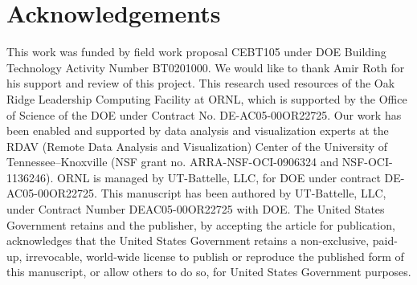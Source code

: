 \documentclass[preprint, review, 12pt]{elsarticle}
\begin{document}
\section{Acknowledgements}
This work was funded by field work proposal CEBT105 under DOE Building Technology Activity Number BT0201000. We would like to thank Amir Roth for his support and review of this project. This research used resources of the Oak Ridge Leadership Computing Facility at ORNL, which is supported by the Office of Science of the DOE under Contract No. DE-AC05-00OR22725. Our work has been enabled and supported by data analysis and visualization experts at the RDAV (Remote Data Analysis and Visualization) Center of the University of Tennessee--Knoxville (NSF grant no. ARRA-NSF-OCI-0906324 and NSF-OCI-1136246). ORNL is managed by UT-Battelle, LLC, for DOE under contract DE-AC05-00OR22725. This manuscript has been authored by UT-Battelle, LLC, under Contract Number DEAC05-00OR22725 with DOE. The United States Government retains and the publisher, by accepting the article for publication, acknowledges that the United States Government retains a non-exclusive, paid-up, irrevocable, world-wide license to publish or reproduce the published form of this manuscript, or allow others to do so, for United States Government purposes.














\end{document}
